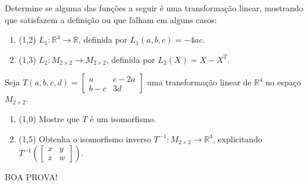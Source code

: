 \documentclass[12pt,a4paper]{article}
\newcommand{\fixme}{{\color{red}(...)}}
\newcommand*\R{\mathbb{R}}
\begin{document}
\begin{ExerciseList}
\Exercise[title={2,5}] Determine se alguma das funções a seguir é uma transformação linear, mostrando que satisfazem a definição ou que falham em alguns casos:
\begin{enumerate}
\item (1,2) $L_1: \R^3 \to \R$, definida por $L_1(a,b,c) = -4ac$.
\item (1,3) $L_2: M_{2 \times 2} \to M_{2 \times 2}$, definida por $L_2(X) = X - X^T$.
\end{enumerate}
\Answer \fixme

\Exercise[title={2,5}] Seja $T(a,b,c,d) = \begin{bmatrix}
 a & c-2a\\
b-c & 3d
\end{bmatrix}$ uma transformação linear de $\R^4$ no espaço $M_{2\times 2}$.
\begin{enumerate}
\item (1,0) Mostre que $T$ é um isomorfismo.
\item (1,5) Obtenha  o isomorfismo inverso $T^{-1}: M_{2 \times 2} \to \R^4$, explicitando $T^{-1}\left(
\begin{bmatrix}
x & y \\
z & w
\end{bmatrix}
\right)$.
\end{enumerate}
\end{ExerciseList}

\begin{center}
BOA PROVA!
\end{center}

\end{document}
